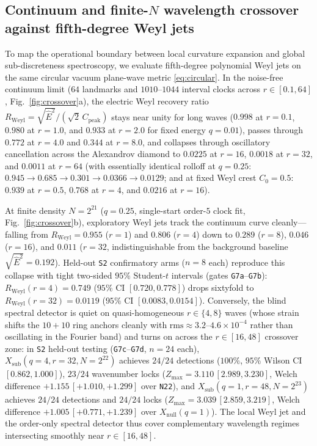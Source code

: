 \documentclass[11pt,a4paper]{article}
\begin{document}
\subsection{Continuum and finite-\texorpdfstring{$N$}{N} wavelength crossover against fifth-degree Weyl jets}
To map the operational boundary between local curvature expansion and global
sub-discreteness spectroscopy, we evaluate fifth-degree polynomial Weyl jets
\cite{weylnote} on the same circular vacuum plane-wave metric \eqref{eq:circular}.
In the noise-free continuum limit ($64$ landmarks and $1010$--$1044$ interval clocks
across $r \in [0.1, 64]$, Fig.~\ref{fig:crossover}a), the electric Weyl recovery ratio
$R_{\text{Weyl}} = \sqrt{\widehat{E}^2}/(\sqrt{2}\,C_{\text{peak}})$ stays near unity
for long waves ($0.998$ at $r=0.1$, $0.980$ at $r=1.0$, and $0.933$ at $r=2.0$ for
fixed energy $q=0.01$), passes through $0.772$ at $r=4.0$ and $0.344$ at $r=8.0$, and
collapses through oscillatory cancellation across the Alexandrov diamond to $0.0225$ at
$r=16$, $0.0018$ at $r=32$, and $0.0011$ at $r=64$ (with essentially identical rolloff
at $q=0.25$: $0.945 \to 0.685 \to 0.301 \to 0.0366 \to 0.0129$; and at fixed Weyl
crest $C_0 = 0.5$: $0.939$ at $r=0.5$, $0.768$ at $r=4$, and $0.0216$ at $r=16$).

At finite density $N = 2^{21}$ ($q = 0.25$, single-start order-$5$ clock fit, Fig.~\ref{fig:crossover}b),
exploratory Weyl jets track the continuum curve cleanly---falling from $R_{\text{Weyl}} = 0.955$
($r=1$) and $0.806$ ($r=4$) down to $0.289$ ($r=8$), $0.046$ ($r=16$), and $0.011$
($r=32$, indistinguishable from the background baseline $\sqrt{\widehat{E}^2} = 0.192$).
Held-out \texttt{S2} confirmatory arms ($n = 8$ each) reproduce this collapse with tight
two-sided $95\%$ Student-$t$ intervals (gates \texttt{G7a}--\texttt{G7b}):
$R_{\text{Weyl}}(r=4) = 0.749$ ($95\%$ CI $[0.720, 0.778]$) drops sixtyfold to
$R_{\text{Weyl}}(r=32) = 0.0119$ ($95\%$ CI $[0.0083, 0.0154]$). Conversely, the blind
spectral detector is quiet on quasi-homogeneous $r \in \{4, 8\}$ waves (whose strain
shifts the $10{+}10$ ring anchors cleanly with $\text{rms} \approx 3.2\text{--}4.6\times 10^{-4}$
rather than oscillating in the Fourier band) and turns on across the $r \in [16, 48]$
crossover zone: in \texttt{S2} held-out testing (\texttt{G7c}--\texttt{G7d}, $n = 24$ each),
$X_{\text{sub}}(q=4, r=32, N=2^{22})$ achieves $24/24$ detections ($100\%$, $95\%$ Wilson CI
$[0.862, 1.000]$), $23/24$ wavenumber locks ($Z_{\max} = 3.110\,[2.989, 3.230]$, Welch
difference $+1.155\,[+1.010, +1.299]$ over \texttt{N22}), and $X_{\text{sub}}(q=1, r=48, N=2^{23})$
achieves $24/24$ detections and $24/24$ locks ($Z_{\max} = 3.039\,[2.859, 3.219]$, Welch
difference $+1.005\,[+0.771, +1.239]$ over $X_{\text{null}}(q=1)$). The local Weyl jet
and the order-only spectral detector thus cover complementary wavelength regimes intersecting
smoothly near $r \in [16, 48]$.
\end{document}
